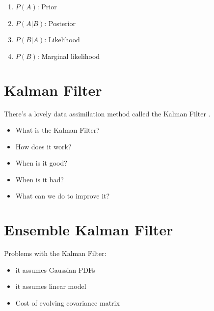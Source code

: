 \begin{enumerate}
    \item $P \left( A \right)$: Prior
    \item $P \left( A|B \right)$: Posterior
    \item $P \left( B|A \right)$: Likelihood
    \item $P \left( B \right)$: Marginal likelihood
\end{enumerate}

\section{Kalman Filter}\label{sec:method:kf}

There's a lovely data assimilation method called the Kalman Filter
\citep{kalman1960new}.

\begin{itemize}
    \item What is the Kalman Filter?
    \item How does it work?
    \item When is it good?
    \item When is it bad?
    \item What can we do to improve it?
\end{itemize}

\section{Ensemble Kalman Filter}\label{sec:method:enkf}

Problems with the Kalman Filter:
\begin{itemize}
    \item it assumes Gaussian PDFs
    \item it assumes linear model
    \item Cost of evolving covariance matrix
\end{itemize}

